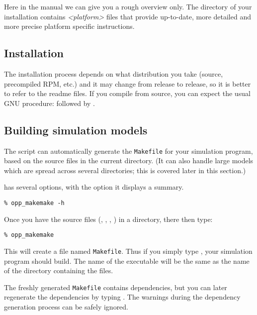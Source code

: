 Here in the manual we can give you a rough overview only.
The  directory of your {\opp} installation contains
\textit{<platform>} files that provide
up-to-date, more detailed and more precise platform specific 
instructions.


\subsection{Installation}

The installation process depends on what distribution you take
(source, precompiled RPM, etc.) and it may change from release
to release, so it is better to refer to the readme files.
If you compile from source, you can expect the usual GNU
procedure:  followed by .


\subsection{Building simulation models}

The  script can automatically generate the
\texttt{Makefile} for your simulation program, based on the source files
in the current directory. (It can also handle large models
which are spread across several directories; this is covered later in
this section.)

 has several options, with the 
option it displays a summary.

\begin{verbatim}
% opp_makemake -h
\end{verbatim}

Once you have the source files (, , ,
) in a directory,  there then type:

\begin{verbatim}
% opp_makemake
\end{verbatim}

This will create a file named \texttt{Makefile}. Thus if you
simply type , your simulation program should build. The name of
the executable will be the same as the name of the directory
containing the files.


The freshly generated \texttt{Makefile} contains
dependencies, but you can later
regenerate the dependencies by typing . 
The warnings during the dependency generation process can 
be safely ignored.

